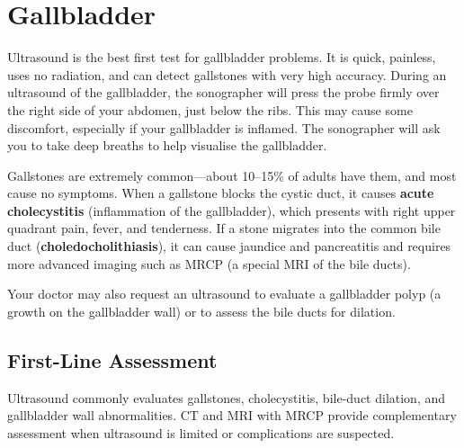 \chapter{Gallbladder}

\label{ch:ch46_gallbladder}

Ultrasound is the best first test for gallbladder problems. It is quick, painless, uses no radiation, and can detect gallstones with very high accuracy. During an ultrasound of the gallbladder, the sonographer will press the probe firmly over the right side of your abdomen, just below the ribs. This may cause some discomfort, especially if your gallbladder is inflamed. The sonographer will ask you to take deep breaths to help visualise the gallbladder.

Gallstones are extremely common---about 10--15\% of adults have them, and most cause no symptoms. When a gallstone blocks the cystic duct, it causes \textbf{acute cholecystitis} (inflammation of the gallbladder), which presents with right upper quadrant pain, fever, and tenderness. If a stone migrates into the common bile duct (\textbf{choledocholithiasis}), it can cause jaundice and pancreatitis and requires more advanced imaging such as MRCP (a special MRI of the bile ducts).

Your doctor may also request an ultrasound to evaluate a gallbladder polyp (a growth on the gallbladder wall) or to assess the bile ducts for dilation.


\section{First-Line Assessment}
Ultrasound commonly evaluates gallstones, cholecystitis, bile-duct dilation, and gallbladder wall abnormalities. CT and MRI with MRCP provide complementary assessment when ultrasound is limited or complications are suspected.

